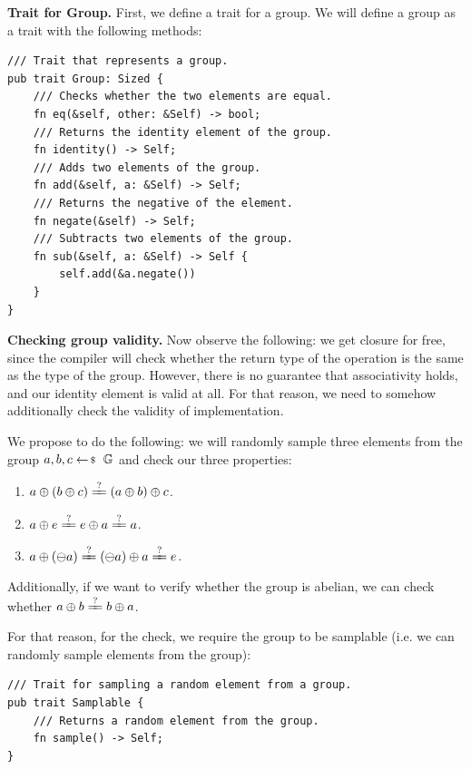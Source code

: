\documentclass[../../book.tex]{subfiles}
\begin{document}
\textbf{Trait for Group.} First, we define a trait for a group. We will define a group as a trait with the following methods:
\begin{verbatim}
/// Trait that represents a group.
pub trait Group: Sized {
    /// Checks whether the two elements are equal.
    fn eq(&self, other: &Self) -> bool;
    /// Returns the identity element of the group.
    fn identity() -> Self;
    /// Adds two elements of the group.
    fn add(&self, a: &Self) -> Self;
    /// Returns the negative of the element.
    fn negate(&self) -> Self;
    /// Subtracts two elements of the group.
    fn sub(&self, a: &Self) -> Self {
        self.add(&a.negate())
    }
}
\end{verbatim}

\textbf{Checking group validity.} Now observe the following: we get closure for free, since the compiler will check 
whether the return type of the operation is the same as the type of the group. However, there is no guarantee that 
associativity holds, and our identity element is valid at all. For that reason, we need to somehow additionally check 
the validity of implementation.

We propose to do the following: we will randomly sample three elements from the group 
$a,b,c \leftarrowS \mathbb{G}$ and check our three properties:
\begin{enumerate}
    \item $a \oplus (b \oplus c) \xlongequal{?} (a \oplus b) \oplus c$.
    \item $a \oplus e \xlongequal{?} e \oplus a \xlongequal{?} a $.
    \item $a \oplus (\ominus a) \xlongequal{?} (\ominus a) \oplus a \xlongequal{?} e$.
\end{enumerate}

Additionally, if we want to verify whether the group is abelian, we can check whether $a \oplus b \xlongequal{?} b \oplus a$. 

For that reason, for the check, we require the group to be samplable (i.e. we can randomly sample elements from the group):
\begin{verbatim}
/// Trait for sampling a random element from a group.
pub trait Samplable {
    /// Returns a random element from the group.
    fn sample() -> Self;
}
\end{verbatim}
\end{document}
